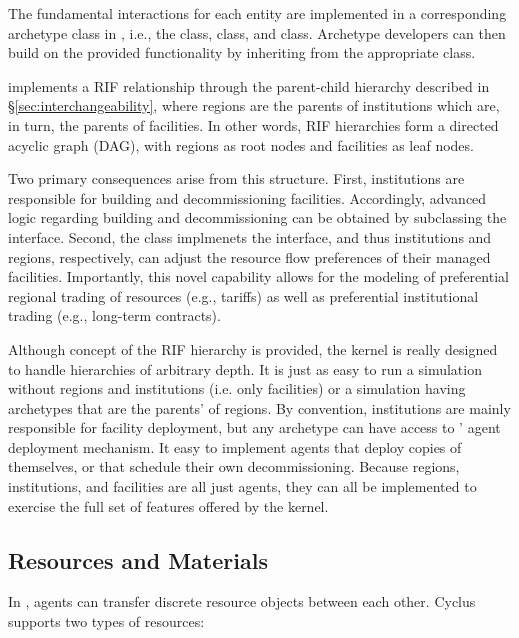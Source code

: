 The fundamental interactions for each entity are implemented in a corresponding
archetype class in \Cyclus, i.e., the  class, 
class, and  class. Archetype developers can then build on the
provided functionality by inheriting from the appropriate class.

\Cyclus implements a \gls{RIF} relationship through the
parent-child hierarchy described in \S \ref{sec:interchangeability}, where
regions are the parents of institutions which are, in turn, the parents of
facilities. In other words, \gls{RIF} hierarchies form a directed acyclic graph (DAG),
with regions as root nodes and facilities as leaf nodes.

Two primary consequences arise from this structure. First, institutions are
responsible for building and decommissioning facilities. Accordingly, advanced
logic regarding building and decommissioning can be obtained by subclassing the
 interface. Second, the  class implmenets the
 interface, and thus institutions and regions, respectively, can
adjust the resource flow preferences of their managed facilities. Importantly,
this novel capability allows for the modeling of preferential regional trading
of resources (e.g., tariffs) as well as preferential institutional trading
(e.g., long-term contracts).

Although concept of the \gls{RIF} hierarchy is provided, the \Cyclus kernel is
really designed to handle hierarchies of arbitrary depth.  It is just as easy
to run a simulation without regions and institutions (i.e.  only facilities)
or a simulation having archetypes that are the parents' of regions.  By
convention, institutions are mainly responsible for facility deployment, but
any archetype can have access to \Cyclus' agent deployment mechanism.  It easy
to implement agents that deploy copies of themselves, or that schedule their
own decommissioning.  Because regions, institutions, and facilities are all
just agents, they can all be implemented to exercise the full set of features
offered by the \Cyclus kernel.

\subsection{Resources and Materials}


In \Cyclus, agents can transfer discrete resource objects between each other.
Cyclus supports two types of resources:

